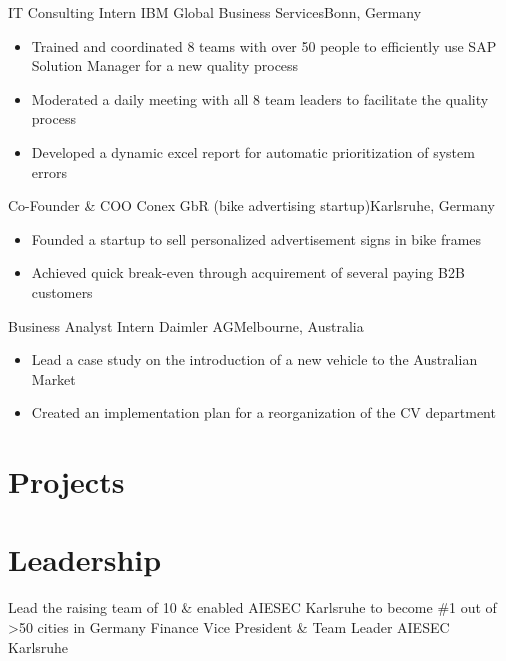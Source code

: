 \documentclass{my_cv}
\begin{document}
{IT Consulting Intern}
{IBM Global Business Services}{Bonn, Germany}
{}
{
\begin{itemize}
\item Trained and coordinated 8 teams with over 50 people to efficiently use SAP Solution Manager for a new quality process
\item Moderated a daily meeting with all 8 team leaders to facilitate the quality process
\item Developed a dynamic excel report for automatic prioritization of system errors
\end{itemize}
}  %

{Co-Founder \& COO}
{Conex GbR (bike advertising startup)}{Karlsruhe, Germany}
{}
{
\begin{itemize}
\item Founded a startup to sell personalized advertisement signs in bike frames
\item Achieved quick break-even through acquirement of several paying B2B customers
\end{itemize}
}  %

{Business Analyst Intern}
{Daimler AG}{Melbourne, Australia}
{}
{
\begin{itemize}
\item Lead a case study on the introduction of a new vehicle to the Australian Market
\item Created an implementation plan for a reorganization of the CV department
\end{itemize}
}  %

\section{Projects}

\section{Leadership}
 \cventry{}
 {Lead the raising team of 10 \& enabled AIESEC Karlsruhe to become \#1 out of >50 cities in Germany}
 {Finance Vice President \& Team Leader}
 {AIESEC Karlsruhe}
 {}{} 
\end{document}
